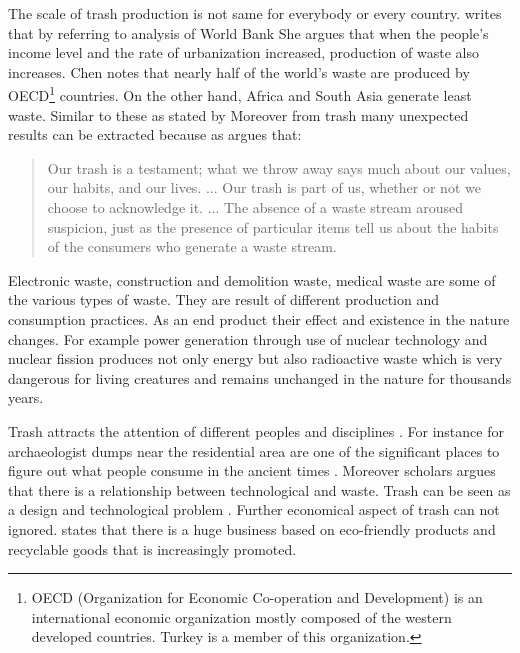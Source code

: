 The scale of trash production is not same for everybody or every country. \citet[2]{chen2015waste} writes that by referring to analysis of World Bank  She argues that when the people's income level and the rate of urbanization increased, production of waste also increases. Chen notes that nearly half of the world’s waste are produced by OECD\footnote{OECD (Organization for Economic Co-operation and Development) is an international economic organization mostly composed of the western developed countries. Turkey is a member of this organization.} countries. On the other hand, Africa and South Asia generate least waste. Similar to these as stated by \citet[16]{cerny1996recycled}  Moreover from trash many unexpected results can be extracted because as \citet[xxv]{zimring2012encyclopedia} argues that:
\begin{quote}
Our trash is a testament; what we throw away says much about our values, our habits, and our lives. ... Our trash is part of us, whether or not we choose to acknowledge it. ... The absence of a waste stream aroused suspicion, just as the presence of particular items tell us about the habits of the consumers who generate a waste stream.
\end{quote}

Electronic waste, construction and demolition waste, medical waste are some of the various types of waste. They are result of different production and consumption practices. As an end product their effect and existence in the nature changes. For example power generation through use of nuclear technology and nuclear fission produces not only energy but also radioactive waste which is very dangerous for living creatures and remains unchanged in the nature for thousands years.

Trash attracts the attention of different peoples and disciplines  \citep[63]{emgin2012trashion}. For instance for archaeologist dumps near the residential area are one of the significant places to figure out what people consume in the ancient times \citep{rathje1992rubbish}. Moreover scholars argues that there is a relationship between technological and waste. Trash can be seen as a design and technological problem \citep{mcdonough2010cradle}. Further economical aspect of trash can not ignored. \citet[65]{emgin2012trashion} states that there is a huge business based on eco-friendly products and recyclable goods that is increasingly promoted.

